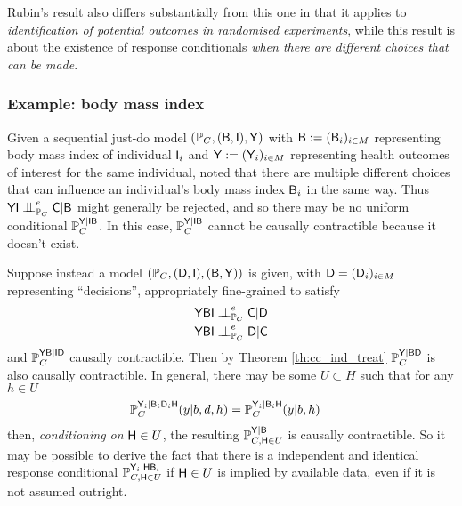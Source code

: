 Rubin's result also differs substantially from this one in that it applies to \emph{identification of potential outcomes in randomised experiments}, while this result is about the existence of response conditionals \emph{when there are different choices that can be made}.

\subsubsection{Example: body mass index}

Given a sequential just-do model $(\mathbb{P}_C,(\mathsf{B},\mathsf{I}),\mathsf{Y})$ with $\mathsf{B}:=(\mathsf{B}_i)_{i\in M}$ representing body mass index of individual $\mathsf{I}_i$ and $\mathsf{Y}:=(\mathsf{Y}_i)_{i\in M}$ representing health outcomes of interest for the same individual, \citet{hernan_does_2008} noted that there are multiple different choices that can influence an individual's body mass index $\mathsf{B}_i$ in the same way. Thus $\RV{YI}\CI^e_{\prob{P}_C} \RV{C}|\RV{B}$ might generally be rejected, and so there may be no uniform conditional $\mathbb{P}_C^{\mathsf{Y}|\mathsf{IB}}$. In this case, $\mathbb{P}_C^{\mathsf{Y}|\mathsf{IB}}$ cannot be causally contractible because it doesn't exist.

Suppose instead a model $(\mathbb{P}_C,(\mathsf{D},\mathsf{I}),(\mathsf{B},\mathsf{Y}))$ is given, with $\mathsf{D}=(\mathsf{D}_i)_{i\in M}$ representing ``decisions'', appropriately fine-grained to satisfy
\begin{align}
    &\RV{YBI}\CI^e_{\prob{P}_C} \RV{C}|\RV{D}\\
    &\RV{YBI}\CI^e_{\prob{P}_C} \RV{D}|\RV{C}
\end{align}
and $\mathbb{P}_C^{\mathsf{YB}|\mathsf{ID}}$ causally contractible. Then by Theorem \ref{th:cc_ind_treat} $\mathbb{P}_C^{\mathsf{Y}|\mathsf{BD}}$ is also causally contractible. In general, there may be some $U\subset H$ such that for any $h\in U$ 
\begin{align}
    \mathbb{P}_C^{\mathsf{Y}_i|\mathsf{B}_i\mathsf{D}_i\mathsf{H}}(y|b,d,h) &= \mathbb{P}_C^{\mathsf{Y}_i|\mathsf{B}_i\mathsf{H}}(y|b,h)\label{eq:conditional_conditional_independence}
\end{align}
then, \emph{conditioning on }$\mathsf{H}\in U$, the resulting $\mathbb{P}_{C,\mathsf{H}\in U}^{\mathsf{Y}|\mathsf{B}}$ is causally contractible.
So it may be possible to derive the fact that there is a independent and identical response conditional $\mathbb{P}_{C,\mathsf{H}\in U}^{\mathsf{Y}_i|\mathsf{H}\mathsf{B}_i}$ if $\mathsf{H}\in U$ is implied by available data, even if it is not assumed outright.

